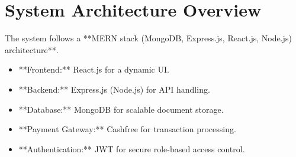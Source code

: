 \section{System Architecture Overview}
The system follows a **MERN stack (MongoDB, Express.js, React.js, Node.js) architecture**.

\begin{itemize}
    \item **Frontend:** React.js for a dynamic UI.
    \item **Backend:** Express.js (Node.js) for API handling.
    \item **Database:** MongoDB for scalable document storage.
    \item **Payment Gateway:** Cashfree for transaction processing.
    \item **Authentication:** JWT for secure role-based access control.
\end{itemize}
